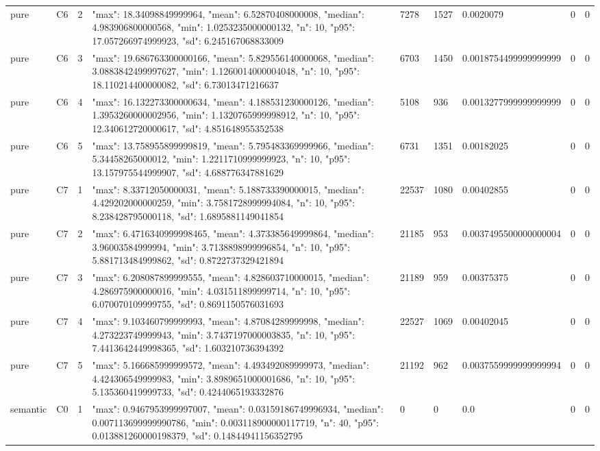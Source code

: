 \begin{tabular}{lllllllll}
pure & C6 & 2 & {"max": 18.34098849999964, "mean": 6.52870408000008, "median": 4.983906800000568, "min": 1.0253235000000132, "n": 10, "p95": 17.057266974999923, "sd": 6.245167068833009} & 7278 & 1527 & 0.0020079 & 0 & 0 \\
pure & C6 & 3 & {"max": 19.686763300000166, "mean": 5.829556140000068, "median": 3.0883842499997627, "min": 1.1260014000004048, "n": 10, "p95": 18.110214400000082, "sd": 6.73013471216637} & 6703 & 1450 & 0.0018754499999999999 & 0 & 0 \\
pure & C6 & 4 & {"max": 16.132273300000634, "mean": 4.188531230000126, "median": 1.3953260000002956, "min": 1.1320765999998912, "n": 10, "p95": 12.340612720000617, "sd": 4.851648955352538} & 5108 & 936 & 0.0013277999999999999 & 0 & 0 \\
pure & C6 & 5 & {"max": 13.758955899999819, "mean": 5.795483369999966, "median": 5.34458265000012, "min": 1.2211710999999923, "n": 10, "p95": 13.157975544999907, "sd": 4.688776347881629} & 6731 & 1351 & 0.00182025 & 0 & 0 \\
pure & C7 & 1 & {"max": 8.33712050000031, "mean": 5.188733390000015, "median": 4.429202000000259, "min": 3.7581728999994084, "n": 10, "p95": 8.238428795000118, "sd": 1.6895881149041854} & 22537 & 1080 & 0.00402855 & 0 & 0 \\
pure & C7 & 2 & {"max": 6.4716340999998465, "mean": 4.373385649999864, "median": 3.96003584999994, "min": 3.7138898999996854, "n": 10, "p95": 5.881713484999862, "sd": 0.8722737329421894} & 21185 & 953 & 0.0037495500000000004 & 0 & 0 \\
pure & C7 & 3 & {"max": 6.208087899999555, "mean": 4.828603710000015, "median": 4.286975900000016, "min": 4.031511899999714, "n": 10, "p95": 6.070070109999755, "sd": 0.8691150576031693} & 21189 & 959 & 0.00375375 & 0 & 0 \\
pure & C7 & 4 & {"max": 9.103460799999993, "mean": 4.87084289999998, "median": 4.273223749999943, "min": 3.7437197000003835, "n": 10, "p95": 7.4413642449998365, "sd": 1.603210736394392} & 22527 & 1069 & 0.00402045 & 0 & 0 \\
pure & C7 & 5 & {"max": 5.166685999999572, "mean": 4.493492089999973, "median": 4.424306549999983, "min": 3.8989651000001686, "n": 10, "p95": 5.135360419999733, "sd": 0.4244065193332876} & 21192 & 962 & 0.0037559999999999994 & 0 & 0 \\
semantic & C0 & 1 & {"max": 0.9467953999997007, "mean": 0.03159186749996934, "median": 0.007113699999990786, "min": 0.003118900000117719, "n": 40, "p95": 0.013881260000198379, "sd": 0.14844941156352795} & 0 & 0 & 0.0 & 0 & 0 \\

\end{tabular}
